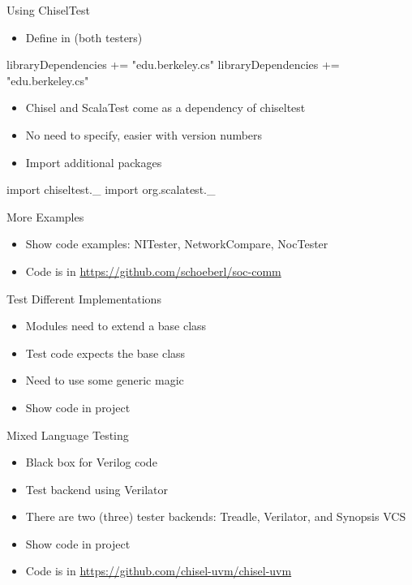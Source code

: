 \begin{frame}[fragile]{Using ChiselTest}
\begin{itemize}
\item Define in  (both testers)
\end{itemize}
\begin{chisel}
libraryDependencies += "edu.berkeley.cs" %
libraryDependencies += "edu.berkeley.cs" %
\end{chisel}
\begin{itemize}
\item Chisel and ScalaTest come as a dependency of chiseltest
\item No need to specify, easier with version numbers
\item Import additional packages
\end{itemize}
\begin{chisel}
import chiseltest._
import org.scalatest._
\end{chisel}
\end{frame}

\begin{frame}[fragile]{More Examples}
\begin{itemize}
\item Show code examples: NITester, NetworkCompare, NocTester
\item Code is in \url{https://github.com/schoeberl/soc-comm}
\end{itemize}
\end{frame}

\begin{frame}[fragile]{Test Different Implementations}
\begin{itemize}
\item Modules need to extend a base class
\item Test code expects the base class
\item Need to use some generic magic
\item Show code in  project
\end{itemize}
\end{frame}

\begin{frame}[fragile]{Mixed Language Testing}
\begin{itemize}
\item Black box for Verilog code
\item Test backend using Verilator
\item There are two (three) tester backends: Treadle, Verilator, and Synopsis VCS
\item Show code in  project
\item Code is in \url{https://github.com/chisel-uvm/chisel-uvm}
\end{itemize}
\end{frame}

